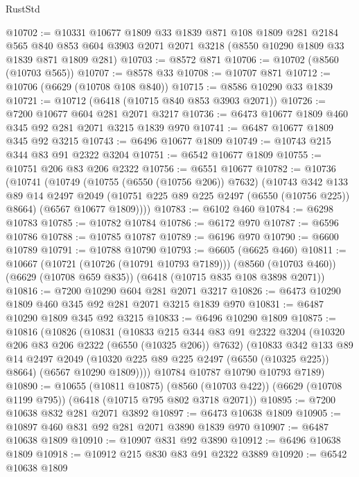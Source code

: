 \begin{lexlean}{RustStd}
\begin{coremodule}
@10702 := @10331
    @10677
    @1809
    @33
    @1839
    @871
    @108
    @1809
    @281
    @2184
    @565
    @840
    @853
    @604
    @3903
    @2071
    @2071
    @3218
    (@8550 @10290 @1809 @33 @1839 @871 @1809 @281)
@10703 := @8572 @871
@10706 := @10702 (@8560 (@10703 @565))
@10707 := @8578 @33
@10708 := @10707 @871
@10712 := @10706 (@6629 (@10708 @108 @840))
@10715 := @8586 @10290 @33 @1839
@10721 := @10712 (@6418 (@10715 @840 @853 @3903 @2071))
@10726 := @7200 @10677 @604 @281 @2071 @3217
@10736 := @6473 @10677 @1809 @460 @345 @92 @281 @2071 @3215 @1839 @970
@10741 := @6487 @10677 @1809 @345 @92 @3215
@10743 := @6496 @10677 @1809
@10749 := @10743 @215 @344 @83 @91 @2322 @3204
@10751 := @6542 @10677 @1809
@10755 := @10751 @206 @83 @206 @2322
@10756 := @6551 @10677
@10782 := @10736
    (@10741
      (@10749
        (@10755 (@6550 (@10756 @206)) @7632)
        (@10743
          @342
          @133
          @89
          @14
          @2497
          @2049
          (@10751 @225 @89 @225 @2497 (@6550 (@10756 @225)) @8664)
          (@6567 @10677 @1809))))
@10783 := @6102 @460
@10784 := @6298 @10783
@10785 := @10782 @10784
@10786 := @6172 @970
@10787 := @6596 @10786
@10788 := @10785 @10787
@10789 := @6196 @970
@10790 := @6600 @10789
@10791 := @10788 @10790
@10793 := @6605 (@6625 @460)
@10811 := @10667
    (@10721 (@10726 (@10791 @10793 @7189)))
    (@8560 (@10703 @460))
    (@6629 (@10708 @659 @835))
    (@6418 (@10715 @835 @108 @3898 @2071))
@10816 := @7200 @10290 @604 @281 @2071 @3217
@10826 := @6473 @10290 @1809 @460 @345 @92 @281 @2071 @3215 @1839 @970
@10831 := @6487 @10290 @1809 @345 @92 @3215
@10833 := @6496 @10290 @1809
@10875 := @10816
    (@10826
      (@10831
        (@10833
          @215
          @344
          @83
          @91
          @2322
          @3204
          (@10320 @206 @83 @206 @2322 (@6550 (@10325 @206)) @7632)
          (@10833
            @342
            @133
            @89
            @14
            @2497
            @2049
            (@10320 @225 @89 @225 @2497 (@6550 (@10325 @225)) @8664)
            (@6567 @10290 @1809))))
      @10784
      @10787
      @10790
      @10793
      @7189)
@10890 := @10655
    (@10811 @10875)
    (@8560 (@10703 @422))
    (@6629 (@10708 @1199 @795))
    (@6418 (@10715 @795 @802 @3718 @2071))
@10895 := @7200 @10638 @832 @281 @2071 @3892
@10897 := @6473 @10638 @1809
@10905 := @10897 @460 @831 @92 @281 @2071 @3890 @1839 @970
@10907 := @6487 @10638 @1809
@10910 := @10907 @831 @92 @3890
@10912 := @6496 @10638 @1809
@10918 := @10912 @215 @830 @83 @91 @2322 @3889
@10920 := @6542 @10638 @1809

\end{coremodule}
\end{lexlean}
